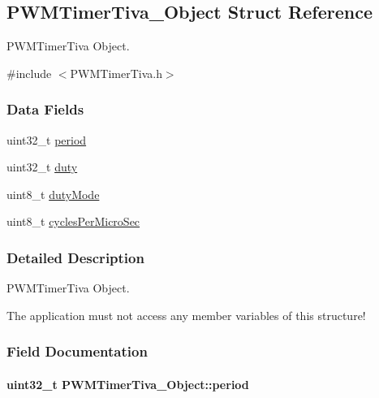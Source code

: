 \subsection{P\-W\-M\-Timer\-Tiva\-\_\-\-Object Struct Reference}
\label{struct_p_w_m_timer_tiva___object}


P\-W\-M\-Timer\-Tiva Object.  




{\ttfamily \#include $<$P\-W\-M\-Timer\-Tiva.\-h$>$}

\subsubsection*{Data Fields}
\begin{DoxyCompactItemize}
\item 
uint32\-\_\-t \hyperlink{struct_p_w_m_timer_tiva___object_a3dfed2664b77fac04d366b271a7e4f59}{period}
\item 
uint32\-\_\-t \hyperlink{struct_p_w_m_timer_tiva___object_a7718c73a04571c4825fffd34c1029170}{duty}
\item 
uint8\-\_\-t \hyperlink{struct_p_w_m_timer_tiva___object_a518e2c1814f2a05da976b4e9da22143b}{duty\-Mode}
\item 
uint8\-\_\-t \hyperlink{struct_p_w_m_timer_tiva___object_a91fd44574b6fdf1c845c61cf28569d9b}{cycles\-Per\-Micro\-Sec}
\end{DoxyCompactItemize}


\subsubsection{Detailed Description}
P\-W\-M\-Timer\-Tiva Object. 

The application must not access any member variables of this structure! 

\subsubsection{Field Documentation}
\paragraph[{period}]{\setlength{\rightskip}{0pt plus 5cm}uint32\-\_\-t P\-W\-M\-Timer\-Tiva\-\_\-\-Object\-::period}\label{struct_p_w_m_timer_tiva___object_a3dfed2664b77fac04d366b271a7e4f59}
